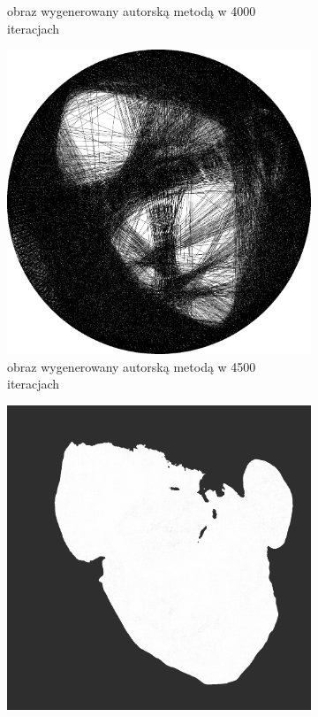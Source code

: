\begin{figure}[H]
\begin{subfigure}{0.23\textwidth}
            \caption{obraz wygenerowany autorską metodą w 4000 iteracjach}
            \label{comp-comp-magdalene-j}
        \end{subfigure}
        \begin{subfigure}{0.23\textwidth}
            \centering
            \includegraphics[width = \textwidth]{img/6-comp/magdalene_e_i4500_c20_inv0_bg1_obj2_ed1.png}
            \caption{obraz wygenerowany autorską metodą w 4500 iteracjach}
            \label{comp-comp-magdalene-k}
        \end{subfigure}
        \begin{subfigure}{0.23\textwidth}
            \centering
            \includegraphics[width = \textwidth]{img/6-comp/magdalene_mask_c20_inv0_bg10_obj1_ed1.png}

\end{subfigure}
\end{figure}
